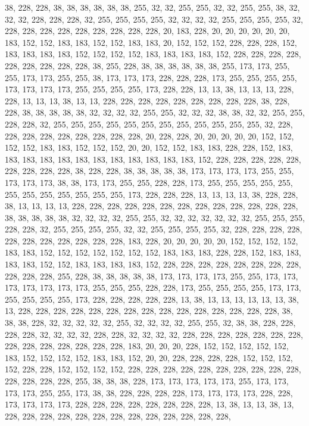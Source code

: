 {	38,  228, 228, 38,  38,  38,  38,  38,  38,  255, 32,  32,  255, 255, 32,  32,  255, 255, 38,  32,  32,  32,  228, 228, 228, 32,  255, 255, 255, 255, 32,  32,  32,  32,  255, 255, 255, 255, 32,  228, 228, 228, 228, 228, 228, 228, 228, 228, 20,  183, 228, 20,  20,  20,  20,  20,  20,  183, 152, 152, 183, 183, 152, 152, 183, 183, 20,  152, 152, 152, 228, 228, 228, 152, 183, 183, 183, 183, 152, 152, 152, 152, 183, 183, 183, 183, 152, 228, 228, 228, 228, 228, 228, 228, 228, 228, 38,  255, 228, 38,  38,  38,  38,  38,  38,  255, 173, 173, 255, 255, 173, 173, 255, 255, 38,  173, 173, 173, 228, 228, 228, 173, 255, 255, 255, 255, 173, 173, 173, 173, 255, 255, 255, 255, 173, 228, 228, 13,  13,  38,  13,  13,  13,  228, 228, 13,  13,  13,  38,  13,  13,  228, 228, 228, 228, 228, 228, 228, 228, 228, 
	38,  228, 228, 38,  38,  38,  38,  38,  32,  32,  32,  32,  255, 255, 32,  32,  32,  38,  38,  32,  32,  255, 255, 228, 228, 32,  255, 255, 255, 255, 255, 255, 255, 255, 255, 255, 255, 255, 32,  228, 228, 228, 228, 228, 228, 228, 228, 228, 20,  228, 228, 20,  20,  20,  20,  20,  152, 152, 152, 152, 183, 183, 152, 152, 152, 20,  20,  152, 152, 183, 183, 228, 228, 152, 183, 183, 183, 183, 183, 183, 183, 183, 183, 183, 183, 183, 152, 228, 228, 228, 228, 228, 228, 228, 228, 228, 38,  228, 228, 38,  38,  38,  38,  38,  173, 173, 173, 173, 255, 255, 173, 173, 173, 38,  38,  173, 173, 255, 255, 228, 228, 173, 255, 255, 255, 255, 255, 255, 255, 255, 255, 255, 255, 255, 173, 228, 228, 228, 13,  13,  13,  13,  38,  228, 228, 38,  13,  13,  13,  13,  228, 228, 228, 228, 228, 228, 228, 228, 228, 228, 
	228, 228, 228, 38,  38,  38,  38,  38,  32,  32,  32,  32,  255, 255, 32,  32,  32,  32,  32,  32,  32,  255, 255, 255, 228, 228, 32,  255, 255, 255, 255, 32,  32,  255, 255, 255, 255, 32,  228, 228, 228, 228, 228, 228, 228, 228, 228, 228, 228, 183, 228, 20,  20,  20,  20,  20,  152, 152, 152, 152, 183, 183, 152, 152, 152, 152, 152, 152, 152, 183, 183, 183, 228, 228, 152, 183, 183, 183, 183, 152, 152, 183, 183, 183, 183, 152, 228, 228, 228, 228, 228, 228, 228, 228, 228, 228, 228, 255, 228, 38,  38,  38,  38,  38,  173, 173, 173, 173, 255, 255, 173, 173, 173, 173, 173, 173, 173, 255, 255, 255, 228, 228, 173, 255, 255, 255, 255, 173, 173, 255, 255, 255, 255, 173, 228, 228, 228, 228, 228, 13,  38,  13,  13,  13,  13,  13,  13,  38,  13,  228, 228, 228, 228, 228, 228, 228, 228, 228, 228, 228, 
	228, 228, 228, 228, 38,  38,  38,  228, 32,  32,  32,  32,  32,  255, 32,  32,  32,  32,  255, 255, 32,  38,  38,  228, 228, 228, 228, 32,  32,  32,  32,  228, 228, 32,  32,  32,  32,  228, 228, 228, 228, 228, 228, 228, 228, 228, 228, 228, 228, 228, 228, 183, 20,  20,  20,  228, 152, 152, 152, 152, 152, 183, 152, 152, 152, 152, 183, 183, 152, 20,  20,  228, 228, 228, 228, 152, 152, 152, 152, 228, 228, 152, 152, 152, 152, 228, 228, 228, 228, 228, 228, 228, 228, 228, 228, 228, 228, 228, 228, 255, 38,  38,  38,  228, 173, 173, 173, 173, 173, 255, 173, 173, 173, 173, 255, 255, 173, 38,  38,  228, 228, 228, 228, 173, 173, 173, 173, 228, 228, 173, 173, 173, 173, 228, 228, 228, 228, 228, 228, 228, 228, 13,  38,  13,  13,  38,  13,  228, 228, 228, 228, 228, 228, 228, 228, 228, 228, 228, 228, 228, 
}
